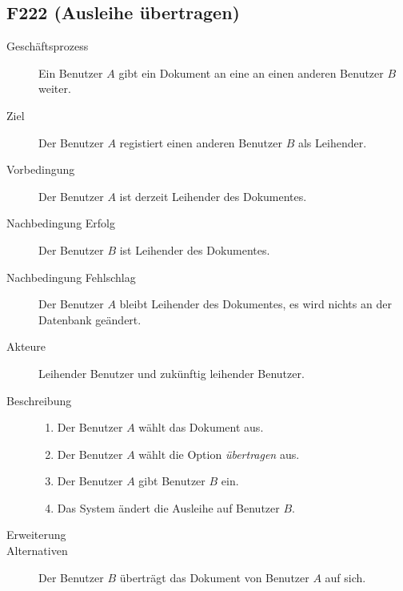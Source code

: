 \subsection{F222 (Ausleihe übertragen)}
\begin{description}
  \item[Geschäftsprozess]Ein Benutzer $A$ gibt ein Dokument an eine an einen anderen Benutzer $B$ weiter.
  \item[Ziel]Der Benutzer $A$ registiert einen anderen Benutzer $B$ als Leihender.
  \item[Vorbedingung]Der Benutzer $A$ ist derzeit Leihender des Dokumentes.
  \item[Nachbedingung Erfolg]Der Benutzer $B$ ist Leihender des Dokumentes.
  \item[Nachbedingung Fehlschlag]Der Benutzer $A$ bleibt Leihender des Dokumentes, es wird nichts an der Datenbank geändert.
  \item[Akteure]Leihender Benutzer und zukünftig leihender Benutzer.
  \item[Beschreibung]\hfill
    \begin{enumerate}
      \item Der Benutzer $A$ wählt das Dokument aus.
      \item Der Benutzer $A$ wählt die Option \emph{übertragen} aus.
      \item Der Benutzer $A$ gibt Benutzer $B$ ein.
      \item Das System ändert die Ausleihe auf Benutzer $B$.
    \end{enumerate}
  \item[Erweiterung]
  \item[Alternativen]Der Benutzer $B$  überträgt das Dokument von Benutzer $A$ auf sich.
\end{description}

